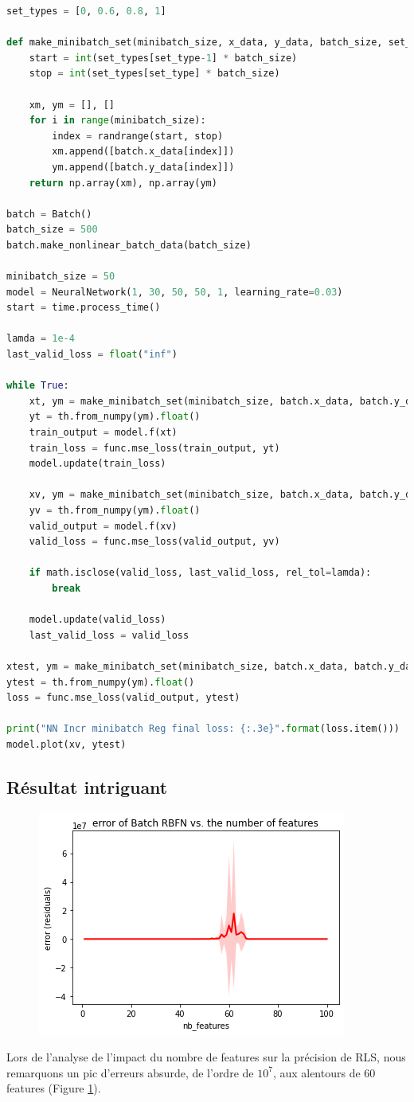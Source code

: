 \documentclass[french,12pt]{article}
\begin{document}
\begin{lstlisting}[language=Python]
set_types = [0, 0.6, 0.8, 1]

def make_minibatch_set(minibatch_size, x_data, y_data, batch_size, set_type):
    start = int(set_types[set_type-1] * batch_size)
    stop = int(set_types[set_type] * batch_size)

    xm, ym = [], []
    for i in range(minibatch_size):
        index = randrange(start, stop)
        xm.append([batch.x_data[index]])
        ym.append([batch.y_data[index]])
    return np.array(xm), np.array(ym)

batch = Batch()
batch_size = 500
batch.make_nonlinear_batch_data(batch_size)

minibatch_size = 50
model = NeuralNetwork(1, 30, 50, 50, 1, learning_rate=0.03)
start = time.process_time()

lamda = 1e-4
last_valid_loss = float("inf")

while True:
    xt, ym = make_minibatch_set(minibatch_size, batch.x_data, batch.y_data, batch_size, 1)
    yt = th.from_numpy(ym).float()
    train_output = model.f(xt)
    train_loss = func.mse_loss(train_output, yt)
    model.update(train_loss)

    xv, ym = make_minibatch_set(minibatch_size, batch.x_data, batch.y_data, batch_size, 2)
    yv = th.from_numpy(ym).float()
    valid_output = model.f(xv)
    valid_loss = func.mse_loss(valid_output, yv)

    if math.isclose(valid_loss, last_valid_loss, rel_tol=lamda):
        break

    model.update(valid_loss)
    last_valid_loss = valid_loss

xtest, ym = make_minibatch_set(minibatch_size, batch.x_data, batch.y_data, batch_size, 3)
ytest = th.from_numpy(ym).float()
loss = func.mse_loss(valid_output, ytest)

print("NN Incr minibatch Reg final loss: {:.3e}".format(loss.item()))
model.plot(xv, ytest)
\end{lstlisting}

\subsection*{Résultat intriguant}

\begin{figure}[h]
\centering
\includegraphics[width=.45\textwidth]{batch_rbfn_error_vs_n_features100.png}
\label{fig:batch_rbfn_error_vs_nfeat100}
\end{figure}

Lors de l'analyse de l'impact du nombre de features sur la précision de RLS, nous remarquons un pic d'erreurs absurde, de l'ordre de $10^7$, aux alentours de 60 features (Figure \ref{fig:batch_rbfn_error_vs_nfeat100}).
\end{document}
